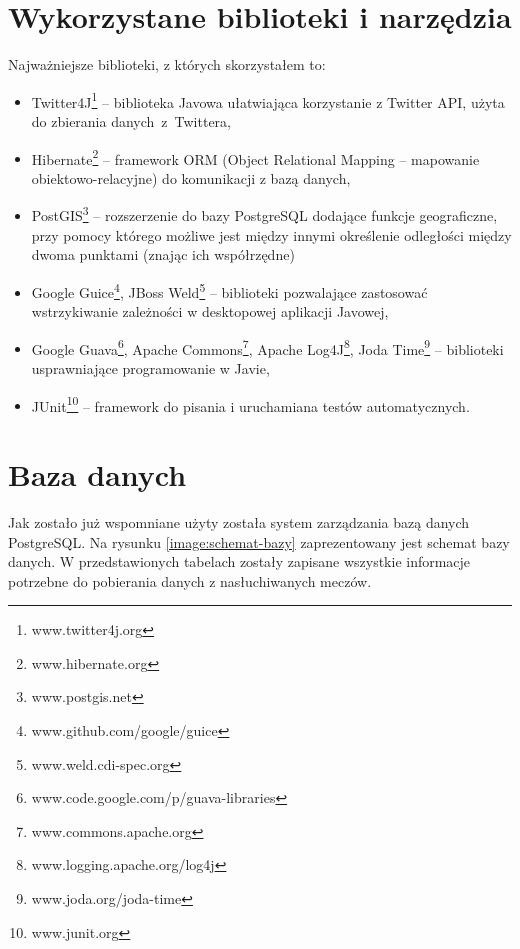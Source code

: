 \section{Wykorzystane biblioteki i narzędzia}
\label{section:bibliotekiinarzedzia}
Najważniejsze biblioteki, z których skorzystałem to:
\begin{itemize}
  \item Twitter4J\footnote{www.twitter4j.org} -- biblioteka Javowa ułatwiająca 
  korzystanie z Twitter API, użyta do zbierania \mbox{danych z Twittera,}
  
  \item Hibernate\footnote{www.hibernate.org} -- framework 
  ORM (Object Relational Mapping --  mapowanie obiektowo-relacyjne) do 
  komunikacji z bazą danych,
  
  \item PostGIS\footnote{www.postgis.net} -- rozszerzenie do bazy PostgreSQL
  dodające funkcje geograficzne, przy pomocy którego możliwe jest między
  innymi określenie odległości między dwoma punktami (znając ich współrzędne)
  
  
  
  \item Google Guice\footnote{www.github.com/google/guice}, 
  JBoss Weld\footnote{www.weld.cdi-spec.org} -- biblioteki pozwalające zastosować
  wstrzykiwanie zależności w desktopowej aplikacji Javowej,
  
  \item Google Guava\footnote{www.code.google.com/p/guava-libraries}, 
  Apache Commons\footnote{www.commons.apache.org}, 
  Apache Log4J\footnote{www.logging.apache.org/log4j}, 
  Joda Time\footnote{www.joda.org/joda-time} -- biblioteki
  usprawniające programowanie w Javie,
  
  \item JUnit\footnote{www.junit.org} -- framework do pisania i uruchamiana
  testów automatycznych.
\end{itemize}


\section{Baza danych}
Jak zostało już wspomniane użyty została system zarządzania bazą danych
PostgreSQL.
Na rysunku \ref{image:schemat-bazy} zaprezentowany jest schemat bazy danych. W
przedstawionych tabelach zostały zapisane wszystkie informacje potrzebne do
pobierania danych z nasłuchiwanych meczów.

